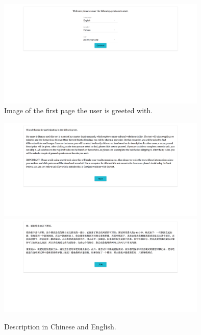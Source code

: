 \newpage
\begin{figure}[h]
	\centering
	\includegraphics[width=100mm]{Images/homepage.png}
	\decoRule
	\caption[Homepage]{Image of the first page the user is greeted with. }
	\label{fig:homepage}
\end{figure}
\begin{figure}[h]
	\centering
	\includegraphics[width=100mm]{Images/homepage_text_en.png}
	\includegraphics[width=100mm]{Images/homepage_text_zh.png}
	\decoRule
	\caption[Homepage]{Description in Chinese and English.}
	\label{fig:homepage_desc}
\end{figure}
\newpage

